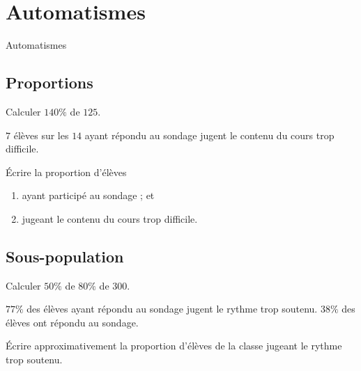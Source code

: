 \documentclass[14pt]{beamer}
\begin{document}
\section{Automatismes}

\begin{frame}

\centering \huge
Automatismes

\end{frame}

\subsection{Proportions}

\begin{frame}{1}
	\centering
	Calculer $140\%$ de $125$.
\end{frame}

\begin{frame}{2}
	$7$ élèves sur les $14$ ayant répondu au sondage jugent le contenu du cours trop difficile.
	
	\vfill
	Écrire la proportion d'élèves
	\begin{enumerate}
		\item ayant participé au sondage ; et
		\item jugeant le contenu du cours trop difficile.
	\end{enumerate}
	
\end{frame}

\subsection{Sous-population}

\begin{frame}{3}
	\centering
	Calculer $50\%$ de $80\%$ de $300$.
\end{frame}

\begin{frame}{4}
	$77\%$ des élèves ayant répondu au sondage jugent le rythme trop soutenu.
	$38\%$ des élèves ont répondu au sondage.
	
	\vfill
	Écrire approximativement la proportion d'élèves de la classe jugeant le rythme trop soutenu.
	
\end{frame}
\end{document}
